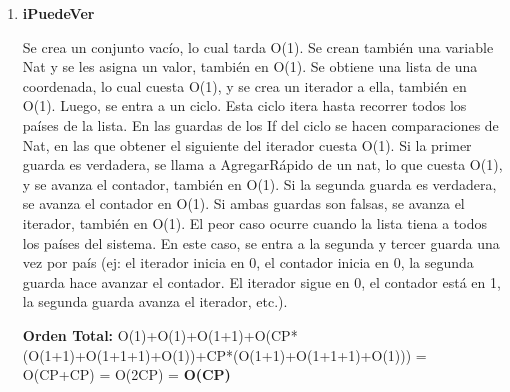 \begin{enumerate}
\item\textbf{iPuedeVer}
\par Se crea un conjunto vacío, lo cual tarda O(1). Se crean también una variable Nat y se les asigna un valor, también en O(1). Se obtiene una lista de una coordenada, lo cual cuesta O(1), y se crea un iterador a ella, también en O(1). Luego, se entra a un ciclo. Esta ciclo itera hasta recorrer todos los países de la lista. En las guardas de los If del ciclo se hacen comparaciones de Nat, en las que obtener el siguiente del iterador cuesta O(1). Si la primer guarda es verdadera, se llama a AgregarRápido de un nat, lo que cuesta O(1), y se avanza el contador, también en O(1). Si la segunda guarda es verdadera, se avanza el contador en O(1). Si ambas guardas son falsas, se avanza el iterador, también en O(1). El peor caso ocurre cuando la lista tiena a todos los países del sistema. En este caso, se entra a la segunda y tercer guarda una vez por país (ej: el iterador inicia en 0, el contador inicia en 0, la segunda guarda hace avanzar el contador. El iterador sigue en 0, el contador está en 1, la segunda guarda avanza el iterador, etc.).
\par\textbf{Orden Total:} O(1)+O(1)+O(1+1)+O(CP*(O(1+1)+O(1+1+1)+O(1))+CP*(O(1+1)+O(1+1+1)+O(1))) = O(CP+CP) = O(2CP) = \textbf{O(CP)}

\end{enumerate}



